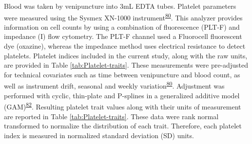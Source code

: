 \documentclass[11pt,twoside]{bristolthesis}
\begin{document}
Blood was taken by venipuncture into 3mL EDTA tubes. Platelet parameters were measured using the Sysmex XN-1000 instrument\textsuperscript{\protect\hyperlink{ref-Astle2016}{80}}. This analyzer provides information on cell counts by using a combination of fluorescence (PLT-F) and impedance (I) flow cytometry. The PLT-F channel used a Fluorocell fluorescent dye (oxazine), whereas the impedance method uses electrical resistance to detect platelets. Platelet indices included in the current study, along with the raw units, are provided in Table \ref{tab:Platelet-traits}. These measurements were pre-adjusted for technical covariates such as time between venipuncture and blood count, as well as instrument drift, seasonal and weekly variation\textsuperscript{\protect\hyperlink{ref-Astle2016}{80}}. Adjustment was performed with cyclic, thin-plate and P-splines in a generalized additive model (GAM)\textsuperscript{\protect\hyperlink{ref-Akbari2020}{82}}. Resulting platelet trait values along with their units of measurement are reported in Table \ref{tab:Platelet-traits}. These data were rank normal transformed to normalize the distribution of each trait. Therefore, each platelet index is measured in normalized standard deviation (SD) units.
\end{document}
